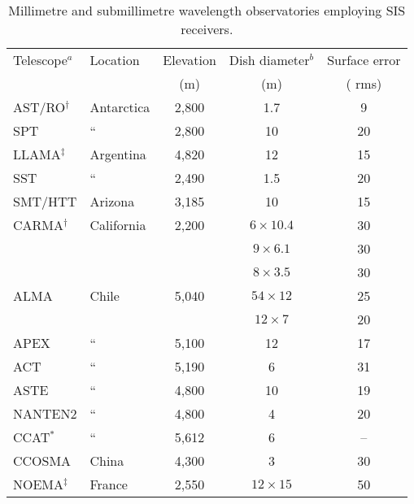 \lipsum[2-4]

\begin{table}[!p]
\centering
\begin{threeparttable}
\caption[Millimetre and submillimetre wavelength observatories.]{Millimetre and submillimetre wavelength observatories employing SIS receivers.}\label{tab:mm-telescopes}
\begin{tabular}{llccc} \toprule
Telescope$^a$    & Location & Elevation & Dish diameter$^b$ & Surface error \\ 
                 &          & (m)       & (m)               & (\um{} rms)   \\ \midrule
AST/RO$^\dagger$ & Antarctica & 2,800       & 1.7           & 9    \\
SPT\hspace{2.5cm}  & ``\hspace{2.5cm} & 2,800 & 10          & 20   \\
LLAMA$^\ddagger$ & Argentina & 4,820        & 12            & 15   \\
SST              & ``       & 2,490         & 1.5           & 20   \\
SMT/HTT          & Arizona  & 3,185         & 10            & 15   \\
CARMA$^\dagger$  & California & 2,200       & $6\times10.4$ & 30   \\
                 &          &               & $9\times6.1$  & 30   \\
                 &          &               & $8\times3.5$  & 30   \\
ALMA             & Chile    & 5,040         & $54\times12$  & 25   \\
                 &          &               & $12\times7$   & 20   \\
APEX             & ``       & 5,100         & 12            & 17   \\
ACT              & ``       & 5,190         & 6             & 31   \\
ASTE             & ``       & 4,800         & 10            & 19   \\
NANTEN2          & ``       & 4,800         & 4             & 20   \\
CCAT$^*$         & ``       & 5,612         & 6             & --   \\
CCOSMA           & China    & 4,300         & 3             & 30   \\
NOEMA$^\ddagger$ & France   & 2,550         & $12\times15$  & 50   \\

\end{tabular}
\end{threeparttable}
\end{table}
